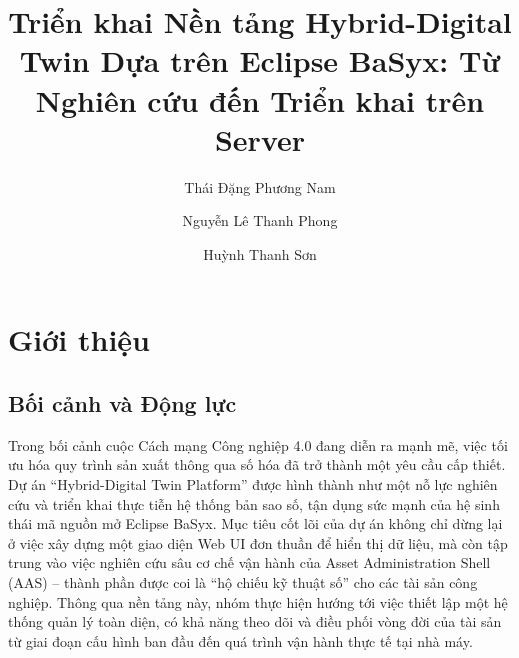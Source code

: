 \documentclass[twocolumn]{article}
\title{\textbf{Triển khai Nền tảng Hybrid-Digital Twin Dựa trên Eclipse BaSyx: Từ Nghiên cứu đến Triển khai trên Server}}
\author[1,2]{Thái Đặng Phương Nam}
\author[2]{Nguyễn Lê Thanh Phong}
\author[2]{Huỳnh Thanh Sơn}
\affil[1]{Người báo cáo chính}
\affil[2]{Wisdom Software}
\affil[*]{TP. Hồ Chí Minh, Tháng 03 năm 2026}
\begin{document}

\section{Giới thiệu}

\subsection{Bối cảnh và Động lực}
Trong bối cảnh cuộc Cách mạng Công nghiệp 4.0 đang diễn ra mạnh mẽ, việc tối ưu hóa quy trình sản xuất thông qua số hóa đã trở thành một yêu cầu cấp thiết. Dự án ``Hybrid-Digital Twin Platform'' được hình thành như một nỗ lực nghiên cứu và triển khai thực tiễn hệ thống bản sao số, tận dụng sức mạnh của hệ sinh thái mã nguồn mở Eclipse BaSyx. Mục tiêu cốt lõi của dự án không chỉ dừng lại ở việc xây dựng một giao diện Web UI đơn thuần để hiển thị dữ liệu, mà còn tập trung vào việc nghiên cứu sâu cơ chế vận hành của Asset Administration Shell (AAS) -- thành phần được coi là ``hộ chiếu kỹ thuật số'' cho các tài sản công nghiệp. Thông qua nền tảng này, nhóm thực hiện hướng tới việc thiết lập một hệ thống quản lý toàn diện, có khả năng theo dõi và điều phối vòng đời của tài sản từ giai đoạn cấu hình ban đầu đến quá trình vận hành thực tế tại nhà máy.
\end{document}
